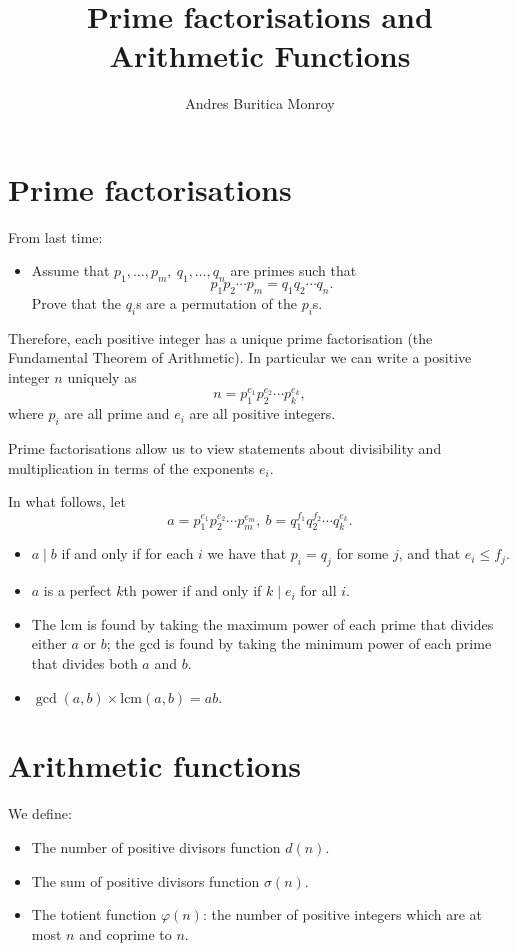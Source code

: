 \documentclass{article}
\title{Prime factorisations and Arithmetic Functions}
\author{Andres Buritica Monroy}
\date{}
\newcommand\lcm{\text{lcm}}
\begin{document}
\maketitle
\section{Prime factorisations}
  From last time:
  \begin{itemize}
    \item Assume that $p_1,\ldots,p_m,\ q_1,\ldots,q_n$ are primes such that
      \[p_1p_2\cdots p_m=q_1q_2\cdots q_n.\]
      Prove that the $q_i$s are a permutation of the $p_i$s.
  \end{itemize}
  Therefore, each positive integer has a unique prime factorisation (the
  Fundamental Theorem of Arithmetic).
  In particular we can write a positive integer $n$ uniquely as
  \[n=p_1^{e_1}p_2^{e_2}\cdots p_k^{e_k},\]
  where $p_i$ are all prime and $e_i$ are all positive integers.

  Prime factorisations allow us to view statements about divisibility and
  multiplication in terms of the exponents $e_i$.

  In what follows, let 
  \[a=p_1^{e_1}p_2^{e_2}\cdots p_m^{e_m},\
        b=q_1^{f_1}q_2^{f_2}\cdots q_k^{e_k}.\]
  \begin{itemize}
    \item $a\mid b$ if and only if for each $i$ we have that $p_i=q_j$
      for some $j$, and that $e_i\le f_j$.
    \item $a$ is a perfect $k$th power if and only if $k\mid e_i$ for all $i$.
    \item The lcm is found by taking the maximum power of each prime that
      divides either $a$ or $b$; the gcd is found by taking the minimum power of
      each prime that divides both $a$ and $b$.
    \item $\gcd(a,b)\times\lcm(a,b)=ab$.
  \end{itemize}
\section{Arithmetic functions}
  We define:
  \begin{itemize}
    \item The number of positive divisors function $d(n)$.
    \item The sum of positive divisors function $\sigma(n)$.
    \item The totient function $\varphi(n)$: the number of positive integers
      which are at most $n$ and coprime to $n$.
  \end{itemize}
\end{document}
